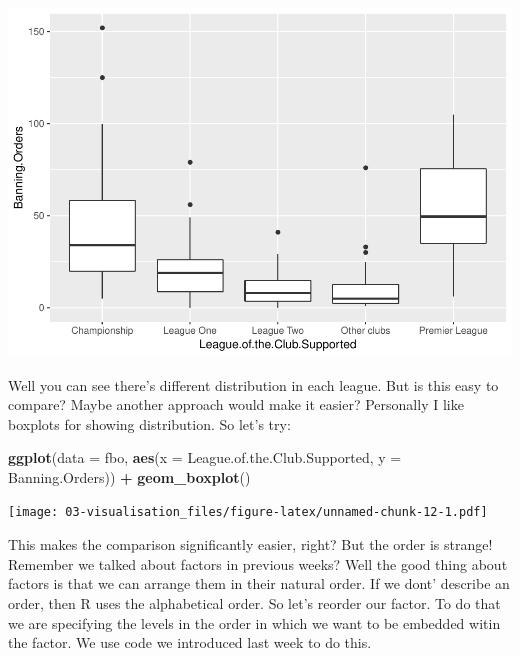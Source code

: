 \documentclass[]{book}
\newenvironment{Shaded}{\begin{snugshade}}{\end{snugshade}}
\newcommand{\DataTypeTok}[1]{\textcolor[rgb]{0.13,0.29,0.53}{#1}}
\newcommand{\KeywordTok}[1]{\textcolor[rgb]{0.13,0.29,0.53}{\textbf{#1}}}
\newcommand{\NormalTok}[1]{#1}
\newcommand{\OperatorTok}[1]{\textcolor[rgb]{0.81,0.36,0.00}{\textbf{#1}}}
\newcommand{\StringTok}[1]{\textcolor[rgb]{0.31,0.60,0.02}{#1}}
\theoremstyle{definition}
\theoremstyle{definition}
\theoremstyle{definition}
\theoremstyle{remark}
\begin{document}
\includegraphics{03-visualisation_files/figure-latex/unnamed-chunk-11-1.pdf}

Well you can see there's different distribution in each league. But is
this easy to compare? Maybe another approach would make it easier?
Personally I like boxplots for showing distribution. So let's try:

\begin{Shaded}
\begin{Highlighting}[]
\KeywordTok{ggplot}\NormalTok{(}\DataTypeTok{data =}\NormalTok{ fbo, }\KeywordTok{aes}\NormalTok{(}\DataTypeTok{x =}\NormalTok{ League.of.the.Club.Supported, }\DataTypeTok{y =}\NormalTok{ Banning.Orders)) }\OperatorTok{+}\StringTok{ }
\StringTok{  }\KeywordTok{geom_boxplot}\NormalTok{() }
\end{Highlighting}
\end{Shaded}

\texttt{[image: 03-visualisation\_files/figure-latex/unnamed-chunk-12-1.pdf]}

This makes the comparison significantly easier, right? But the order is
strange! Remember we talked about factors in previous weeks? Well the
good thing about factors is that we can arrange them in their natural
order. If we dont' describe an order, then R uses the alphabetical
order. So let's reorder our factor. To do that we are specifying the
levels in the order in which we want to be embedded witin the factor. We
use code we introduced last week to do this.

\begin{Shaded}
\end{Shaded}
\end{document}
